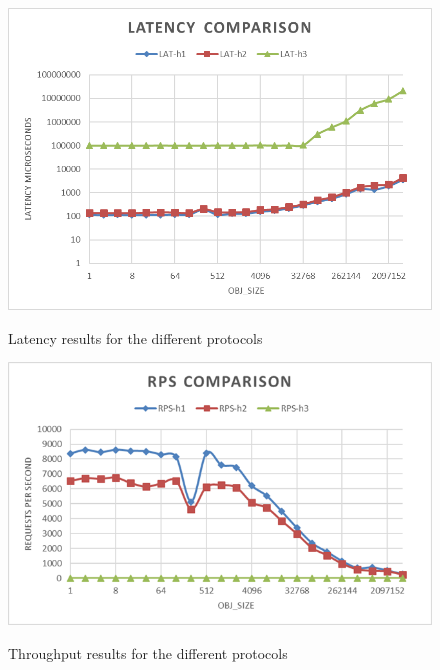 \documentclass[runningheads]{llncs}
\begin{document}
\begin{figure}
    \centering
    \begin{minipage}{0.49\textwidth}
        \centering\vspace{-2em}
        \includegraphics[width=1\textwidth]{lat-h2load-mistral.png}\vspace{-1em}
        \caption{Latency results for the different protocols}\vspace{-1.5em}
		\label {fig:lat-comp-mistral}
    \end{minipage}\hfill
    \begin{minipage}{0.49\textwidth}
        \centering\vspace{-2em}
        \includegraphics[width=1\textwidth]{rps-h2load-mistral.png}\vspace{-1em}
        \caption{Throughput results for the different protocols}\vspace{-1.5em}
		\label {fig:rps-comp-mistral}
    \end{minipage}
\end{figure}
\end{document}
